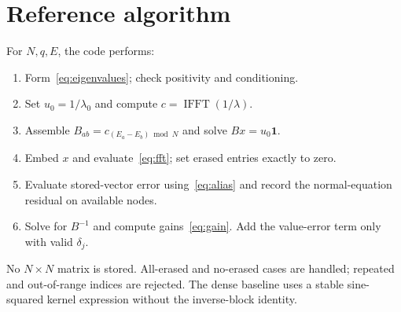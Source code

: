 \documentclass[final,leqno,letterpaper]{etna}
\newcommand{\one}{\boldsymbol 1}\newcommand{\norm}[1]{\left\lVert#1\right\rVert}
\begin{document}
\FloatBarrier
\section{Reference algorithm}
For $N,q,E$, the code performs:
\begin{enumerate}[leftmargin=*,itemsep=2pt]
\item Form~\eqref{eq:eigenvalues}; check positivity and conditioning.
\item Set $u_0=1/\lambda_0$ and compute $c=\operatorname{IFFT}(1/\lambda)$.
\item Assemble $B_{ab}=c_{(E_a-E_b)\bmod N}$ and solve $Bx=u_0\one$.
\item Embed $x$ and evaluate~\eqref{eq:fft}; set erased entries exactly to zero.
\item Evaluate stored-vector error using~\eqref{eq:alias} and record the normal-equation residual on available nodes.
\item Solve for $B^{-1}$ and compute gains~\eqref{eq:gain}. Add the value-error term only with valid $\delta_j$.
\end{enumerate}
No $N\times N$ matrix is stored. All-erased and no-erased cases are handled; repeated and out-of-range indices are rejected. The dense baseline uses a stable sine-squared kernel expression without the inverse-block identity.
\end{document}
